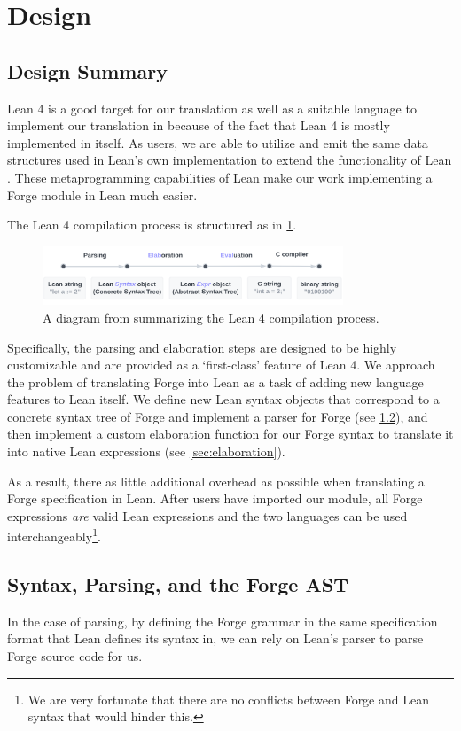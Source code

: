 \section{Design}
\subsection{Design Summary}
Lean 4 is a good target for our translation as well as a suitable language to implement our translation in because of the fact that Lean 4 is mostly implemented in itself. As users, we are able to utilize and emit the same data structures used in Lean's own implementation to extend the functionality of Lean \cite{moura2021lean}. These metaprogramming capabilities of Lean make our work implementing a Forge module in Lean much easier. 

The Lean 4 compilation process is structured as in \cref{fig:lean-compilation}. 
\begin{figure}[h!]
\centering
\includegraphics[width=0.8\textwidth]{images/lean-compiler.png}
\caption{A diagram from \cite{metaprogramming} summarizing the Lean 4 compilation process.}
\label{fig:lean-compilation}
\end{figure}

Specifically, the parsing and elaboration steps are designed to be highly customizable and are provided as a `first-class' feature of Lean 4. We approach the problem of translating Forge into Lean as a task of adding new language features to Lean itself. We define new Lean syntax objects that correspond to a concrete syntax tree of Forge and implement a parser for Forge (see \cref{sec:parsing}), and then implement a custom elaboration function for our Forge syntax to translate it into native Lean expressions (see \cref{sec:elaboration}). 

As a result, there as little additional overhead as possible when translating a Forge specification in Lean. After users have imported our module, all Forge expressions \emph{are} valid Lean expressions and the two languages can be used interchangeably\footnote{We are very fortunate that there are no conflicts between Forge and Lean syntax that would hinder this.}.

\subsection{Syntax, Parsing, and the Forge AST}\label{sec:parsing}
In the case of parsing, by defining the Forge grammar in the same specification format that Lean defines its syntax in, we can rely on Lean's parser to parse Forge source code for us.

